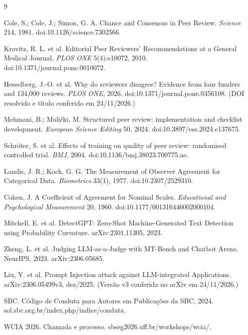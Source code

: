 \documentclass[10pt,a4paper,twocolumn]{article}
\begin{document}
\begin{thebibliography}{9}\small

 Cole, S.; Cole, J.; Simon, G. A. Chance and Consensus in Peer Review. \emph{Science} 214, 1981. doi:10.1126/science.7302566.

 Kravitz, R. L. et al. Editorial Peer Reviewers' Recommendations at a General Medical Journal. \emph{PLOS ONE} 5(4):e10072, 2010. doi:10.1371/journal.pone.0010072.

 Hesselberg, J.-O. et al. Why do reviewers disagree? Evidence from four funders and 134,000 reviews. \emph{PLOS ONE}, 2026. doi:10.1371/journal.pone.0356108. (DOI resolvido e título conferido em 24/11/2026.)

 Mehmani, B.; Malički, M. Structured peer review: implementation and checklist development. \emph{European Science Editing} 50, 2024. doi:10.3897/ese.2024.e137675.

 Schröter, S. et al. Effects of training on quality of peer review: randomised controlled trial. \emph{BMJ}, 2004. doi:10.1136/bmj.38023.700775.ae.

 Landis, J. R.; Koch, G. G. The Measurement of Observer Agreement for Categorical Data. \emph{Biometrics} 33(1), 1977. doi:10.2307/2529310.

 Cohen, J. A Coefficient of Agreement for Nominal Scales. \emph{Educational and Psychological Measurement} 20, 1960. doi:10.1177/001316446002000104.

 Mitchell, E. et al. DetectGPT: Zero-Shot Machine-Generated Text Detection using Probability Curvature. arXiv:2301.11305, 2023.

 Zheng, L. et al. Judging LLM-as-a-Judge with MT-Bench and Chatbot Arena. NeurIPS, 2023. arXiv:2306.05685.

 Liu, Y. et al. Prompt Injection attack against LLM-integrated Applications. arXiv:2306.05499v3, dez/2025. (Versão v3 conferida no arXiv em 24/11/2026.)

 SBC. Código de Conduta para Autores em Publicações da SBC, 2024. sol.sbc.org.br/index.php/indice/conduta.

 WCIA 2026. Chamada e processo. sbseg2026.uff.br/workshops/wcia/.

\end{thebibliography}
\end{document}
